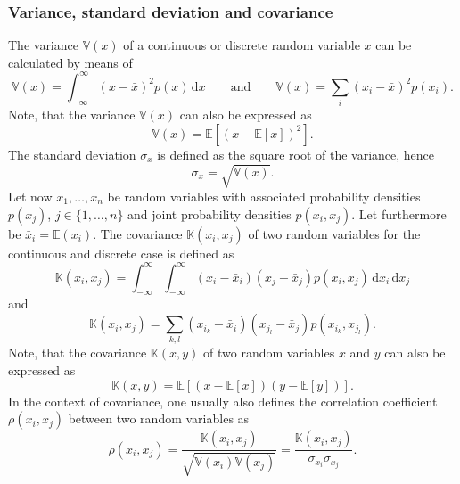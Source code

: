 \documentclass[a4paper,11pt]{article}
\numberwithin{equation}{section}
\begin{document}
\subsubsection{Variance, standard deviation and covariance}
The variance $\mathbb{V}(x)$ of a continuous or discrete random variable $x$ can be calculated by means of \begin{equation}
	\mathbb{V}(x) = \int_{-\infty}^{\infty} (x-\bar{x})^2p(x)\,\mathrm{d}x \qquad \text{and} \qquad \mathbb{V}(x) = \sum_{i} (x_i-\bar{x})^2p(x_i).
\end{equation}
Note, that the variance $\mathbb{V}(x)$ can also be expressed as \begin{equation}\mathbb{V}(x) = \mathbb{E}\left[(x-\mathbb{E}[x])^2\right].\end{equation} The standard deviation $\sigma_x$ is defined as the square root of the variance, hence \begin{equation}
	\sigma_x = \sqrt{\mathbb{V}(x)}.
\end{equation}
Let now $x_1,\dots,x_n$ be random variables with associated probability densities $p(x_j)$, $j\in \{1,\dots,n\}$ and joint probability densities $p(x_i,x_j)$. Let furthermore be $\bar{x}_i = \mathbb{E}(x_i)$. The covariance $\mathbb{K}(x_i,x_j)$ of two random variables for the continuous and discrete case is defined as \begin{equation}\label{eq:covariance}
	\mathbb{K}(x_i,x_j) = \int_{-\infty}^{\infty}\int_{-\infty}^{\infty}(x_i-\bar{x}_i)(x_j-\bar{x}_j)p(x_i,x_j)\,\mathrm{d}x_i\,\mathrm{d}x_j
\end{equation} and \begin{equation}
	\mathbb{K}(x_i,x_j) = \sum_{k,l}(x_{i_k}-\bar{x}_i)(x_{j_l}-\bar{x}_j)p(x_{i_k},x_{j_l}).
\end{equation} Note, that the covariance $\mathbb{K}(x,y)$ of two random variables $x$ and $y$ can also be expressed as \begin{equation}\mathbb{K}(x,y) = \mathbb{E}\left[(x-\mathbb{E}[x])(y-\mathbb{E}[y])\right].\end{equation} In the context of covariance, one usually also defines the correlation coefficient $\rho(x_i,x_j)$ between two random variables as \begin{equation}\label{eq:correlationcoefficient}
	\rho(x_i,x_j) = \frac{\mathbb{K}(x_i,x_j)}{\sqrt{\mathbb{V}(x_i)\mathbb{V}(x_j)}} = \frac{\mathbb{K}(x_i,x_j)}{\sigma_{x_i}\sigma_{x_j}}.
\end{equation} %
\end{document}
